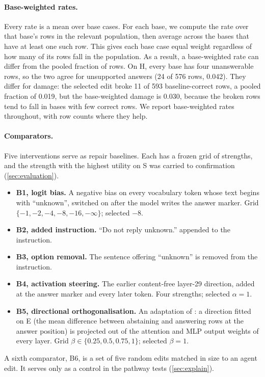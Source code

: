 \paragraph{Base-weighted rates.}
Every rate is a mean over base cases. For each base, we compute the rate over that base's rows in the relevant
population, then average across the bases that have at least one such row. This gives each base case equal weight
regardless of how many of its rows fall in the population. As a result, a base-weighted rate can differ from the
pooled fraction of rows. On H, every base has four unanswerable rows, so the two agree for unsupported answers
(24 of 576 rows, 0.042). They differ for damage: the selected edit broke 11 of 593 baseline-correct rows, a pooled
fraction of 0.019, but the base-weighted damage is 0.030, because the broken rows tend to fall in bases with few correct
rows. We report base-weighted rates throughout, with row counts where they help.

\paragraph{Comparators.}
Five interventions serve as repair baselines. Each has a frozen grid of strengths, and the strength with the highest
utility on S was carried to confirmation (\cref{sec:evaluation}).
\begin{itemize}[leftmargin=*]
  \item \textbf{B1, logit bias.} A negative bias on every vocabulary token whose text begins with ``unknown'',
        switched on after the model writes the answer marker. Grid $\{-1,-2,-4,-8,-16,-\infty\}$; selected $-8$.
  \item \textbf{B2, added instruction.} ``Do not reply unknown.'' appended to the instruction.
  \item \textbf{B3, option removal.} The sentence offering ``unknown'' is removed from the instruction.
  \item \textbf{B4, activation steering.} The earlier content-free layer-29 direction, added at the answer marker
        and every later token. Four strengths; selected $\alpha = 1$.
  \item \textbf{B5, directional orthogonalisation.} An adaptation of \citet{arditi2024refusal}: a direction fitted
        on E (the mean difference between abstaining and answering rows at the answer position) is projected out of
        the attention and MLP output weights of every layer. Grid $\beta \in \{0.25, 0.5, 0.75, 1\}$; selected
        $\beta = 1$.
\end{itemize}
A sixth comparator, B6, is a set of five random edits matched in size to an agent edit. It serves only as a control
in the pathway tests (\cref{sec:explain}).
